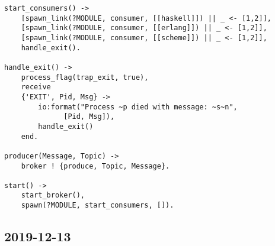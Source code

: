\begin{lstlisting}
start_consumers() ->
    [spawn_link(?MODULE, consumer, [[haskell]]) || _ <- [1,2]],
    [spawn_link(?MODULE, consumer, [[erlang]]) || _ <- [1,2]],
    [spawn_link(?MODULE, consumer, [[scheme]]) || _ <- [1,2]],
    handle_exit().

handle_exit() ->
    process_flag(trap_exit, true),
    receive
	{'EXIT', Pid, Msg} ->
	    io:format("Process ~p died with message: ~s~n",
		      [Pid, Msg]),
	    handle_exit()
    end.

producer(Message, Topic) ->
    broker ! {produce, Topic, Message}.

start() ->
    start_broker(),
    spawn(?MODULE, start_consumers, []).

\end{lstlisting}

\subsection{2019-12-13}

